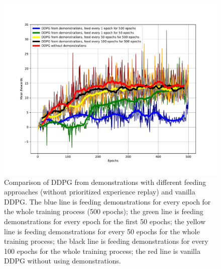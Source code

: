 \documentclass{article}
\begin{document}
\begin{figure}[htbp]
	\centering
	\includegraphics[scale=0.5]{img/ddpgfd1.pdf}
	\caption{Comparison of DDPG from demonstrations with different feeding approaches (without prioritized experience replay) and vanilla DDPG. The blue line is feeding demonstrations for every epoch for the whole training process (500 epochs); the green line is feeding demonstrations for every epoch for the first 50 epochs; the yellow line is feeding demonstrations for every 50 epochs for the whole training process; the black line is feeding demonstrations for every 100 epochs for the whole training process; the red line is vanilla DDPG without using demonstrations. }
	\label{fig:ddpgfd1}
\end{figure}
\end{document}

